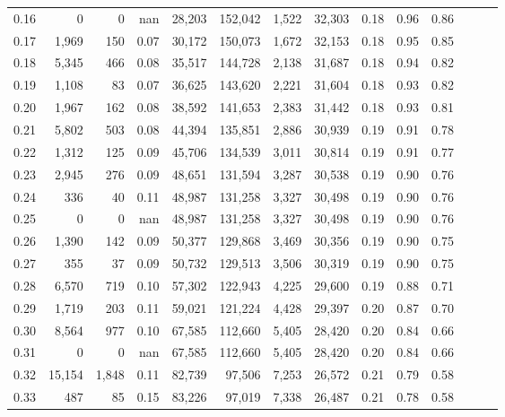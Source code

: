 \begin{tabular}{rrrrrrrrrrrrrr}
0.16 &       0 &      0 &   nan &   28,203 &  152,042 &   1,522 &  32,303 &  0.18 &  0.96 &      0.86 \\
0.17 &   1,969 &    150 &  0.07 &   30,172 &  150,073 &   1,672 &  32,153 &  0.18 &  0.95 &      0.85 \\
0.18 &   5,345 &    466 &  0.08 &   35,517 &  144,728 &   2,138 &  31,687 &  0.18 &  0.94 &      0.82 \\
0.19 &   1,108 &     83 &  0.07 &   36,625 &  143,620 &   2,221 &  31,604 &  0.18 &  0.93 &      0.82 \\
0.20 &   1,967 &    162 &  0.08 &   38,592 &  141,653 &   2,383 &  31,442 &  0.18 &  0.93 &      0.81 \\
0.21 &   5,802 &    503 &  0.08 &   44,394 &  135,851 &   2,886 &  30,939 &  0.19 &  0.91 &      0.78 \\
0.22 &   1,312 &    125 &  0.09 &   45,706 &  134,539 &   3,011 &  30,814 &  0.19 &  0.91 &      0.77 \\
0.23 &   2,945 &    276 &  0.09 &   48,651 &  131,594 &   3,287 &  30,538 &  0.19 &  0.90 &      0.76 \\
0.24 &     336 &     40 &  0.11 &   48,987 &  131,258 &   3,327 &  30,498 &  0.19 &  0.90 &      0.76 \\
0.25 &       0 &      0 &   nan &   48,987 &  131,258 &   3,327 &  30,498 &  0.19 &  0.90 &      0.76 \\
0.26 &   1,390 &    142 &  0.09 &   50,377 &  129,868 &   3,469 &  30,356 &  0.19 &  0.90 &      0.75 \\
0.27 &     355 &     37 &  0.09 &   50,732 &  129,513 &   3,506 &  30,319 &  0.19 &  0.90 &      0.75 \\
0.28 &   6,570 &    719 &  0.10 &   57,302 &  122,943 &   4,225 &  29,600 &  0.19 &  0.88 &      0.71 \\
0.29 &   1,719 &    203 &  0.11 &   59,021 &  121,224 &   4,428 &  29,397 &  0.20 &  0.87 &      0.70 \\
0.30 &   8,564 &    977 &  0.10 &   67,585 &  112,660 &   5,405 &  28,420 &  0.20 &  0.84 &      0.66 \\
0.31 &       0 &      0 &   nan &   67,585 &  112,660 &   5,405 &  28,420 &  0.20 &  0.84 &      0.66 \\
0.32 &  15,154 &  1,848 &  0.11 &   82,739 &   97,506 &   7,253 &  26,572 &  0.21 &  0.79 &      0.58 \\
0.33 &     487 &     85 &  0.15 &   83,226 &   97,019 &   7,338 &  26,487 &  0.21 &  0.78 &      0.58 \\

\end{tabular}
